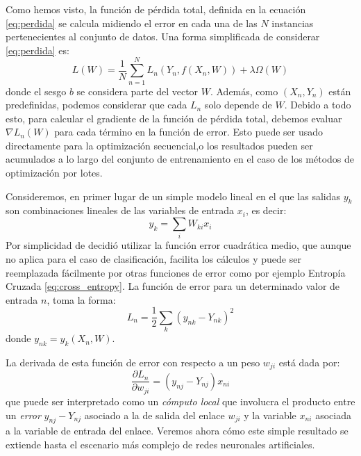 \documentclass[a4paper,11pt,spanish]{book}
\begin{document}
	Como hemos visto, la función de pérdida total, definida en la ecuación \eqref{eq:perdida} se calcula midiendo el error en cada una de las $N$ instancias pertenecientes 
	al conjunto de datos.
	Una forma simplificada de considerar \eqref{eq:perdida} es:
	\begin{equation} \label {eq:perdida_simplificada}
	  L(W) = \frac{1}{N}\sum_{n=1}^{N} L_n(Y_n, f(X_n, W)) + \lambda \Omega(W)
	\end{equation}
	donde el sesgo $b$ se considera parte del vector $W$. Además, como $(X_n, Y_n)$ están predefinidas, podemos considerar que cada $L_n$ solo depende de $W$.
	Debido a todo esto, para calcular el gradiente de la función de pérdida total, debemos evaluar $\nabla L_n(W)$ para cada término en la función de error. 
	Esto puede ser usado directamente para la optimización secuencial,o los resultados pueden ser acumulados a lo largo  del conjunto de entrenamiento en el 
	caso de los métodos de optimización por lotes.
	
	Consideremos, en primer lugar de un simple modelo lineal en el que las salidas $y_k$ son combinaciones lineales de las variables de entrada $x_i$, es decir:
	\begin{equation*}
	  y_k = \sum_i W_{ki} x_i
	\end{equation*}
	Por simplicidad de decidió utilizar la función error cuadrática medio, que aunque no aplica para el caso de clasificación, facilita los cálculos y puede
	ser reemplazada fácilmente por otras funciones de error como por ejemplo Entropía Cruzada \eqref{eq:cross_entropy}. 
	La función de error para un determinado valor de entrada $n$, toma la forma:
	\begin{equation*}
	  L_n = \frac{1}{2} \sum_k (y_{nk}-Y_{nk})^2   %
	\end{equation*}
	donde $y_{nk} = y_{k} (X_n , W)$.
	
	La derivada de esta función de error con respecto a un peso $w_{ji}$ está dada por:
	\begin{equation*}
	  \frac{\partial L_n}{\partial w_{ji}} = (y_{nj} − Y_{nj}) x_{ni}
	\end{equation*}
	que puede ser interpretado como un \emph{cómputo local} que involucra el producto entre un \emph{error} $y_{nj} − Y_{nj}$ asociado a la de salida del enlace $w_{ji}$ y 
	la variable $x_{ni}$ asociada a la variable de entrada del enlace.
	Veremos ahora cómo este simple resultado se extiende hasta el escenario más complejo de redes neuronales artificiales.
\end{document}
